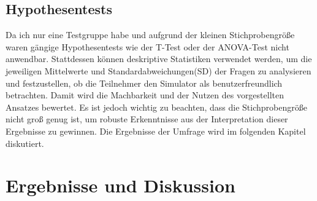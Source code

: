 \documentclass[german,version-2020-11]{uzl-thesis}
\begin{document}
\section{Hypothesentests}
  Da ich nur eine Testgruppe habe und aufgrund der kleinen Stichprobengröße waren gängige Hypothesentests wie der T-Test oder der ANOVA-Test nicht anwendbar. 
  Stattdessen können deskriptive Statistiken verwendet werden, um die jeweiligen Mittelwerte und Standardabweichungen(SD) der Fragen zu analysieren und festzustellen, 
  ob die Teilnehmer den Simulator als benutzerfreundlich betrachten. Damit wird die Machbarkeit und der Nutzen des vorgestellten Ansatzes bewertet. 
  Es ist jedoch wichtig zu beachten, dass die Stichprobengröße nicht groß genug ist, um robuste Erkenntnisse aus der Interpretation dieser Ergebnisse zu gewinnen.
  Die Ergebnisse der Umfrage wird im folgenden Kapitel diskutiert.


    
%

      
          

\chapter{Ergebnisse und Diskussion}
\label{chapter-result}
\end{document}
